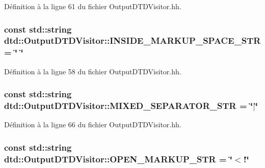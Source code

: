 Définition à la ligne 61 du fichier OutputDTDVisitor.hh.

\hypertarget{classdtd_1_1_output_d_t_d_visitor_a32ceb547a079fa2498ff14d1aef6e112}{
\subsubsection[{INSIDE\_\-MARKUP\_\-SPACE\_\-STR}]{\setlength{\rightskip}{0pt plus 5cm}const std::string {\bf dtd::OutputDTDVisitor::INSIDE\_\-MARKUP\_\-SPACE\_\-STR} = \char`\"{} \char`\"{}}}
\label{classdtd_1_1_output_d_t_d_visitor_a32ceb547a079fa2498ff14d1aef6e112}


Définition à la ligne 58 du fichier OutputDTDVisitor.hh.

\hypertarget{classdtd_1_1_output_d_t_d_visitor_af583c776fabca5615d43da966dca600c}{
\subsubsection[{MIXED\_\-SEPARATOR\_\-STR}]{\setlength{\rightskip}{0pt plus 5cm}const std::string {\bf dtd::OutputDTDVisitor::MIXED\_\-SEPARATOR\_\-STR} = \char`\"{}$|$\char`\"{}}}
\label{classdtd_1_1_output_d_t_d_visitor_af583c776fabca5615d43da966dca600c}


Définition à la ligne 66 du fichier OutputDTDVisitor.hh.

\hypertarget{classdtd_1_1_output_d_t_d_visitor_aac75a1ed1d3189d021a65c5d56d1527e}{
\subsubsection[{OPEN\_\-MARKUP\_\-STR}]{\setlength{\rightskip}{0pt plus 5cm}const std::string {\bf dtd::OutputDTDVisitor::OPEN\_\-MARKUP\_\-STR} = \char`\"{}$<$!\char`\"{}}}
\label{classdtd_1_1_output_d_t_d_visitor_aac75a1ed1d3189d021a65c5d56d1527e}


